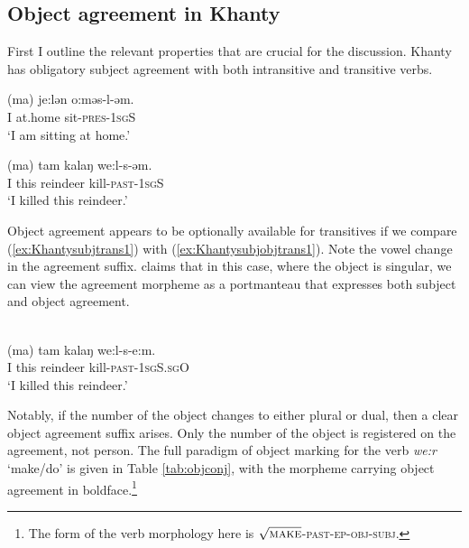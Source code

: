 \documentclass[output=paper
,modfonts
,nonflat]{langsci/langscibook}
\begin{document}
\subsection{Object agreement in Khanty}\label{khantyprop}

First I outline the relevant properties that are crucial for the discussion.
Khanty has obligatory subject agreement with both intransitive and transitive verbs. 

\begin{exe}
\ex \citet[][142]{dn2011}
\begin{xlist}
\ex
{\gll (ma) je:lən o:məs-l-əm.\\
I at.home sit-\textsc{pres}-\textsc{1sgS}\\
\glt `I am sitting at home.'} \label{ex:ostsubjintrans1}

\ex
{\gll (ma) tam kalaŋ we:l-s-əm.\\
I this reindeer kill-\textsc{past-1sgS}\\
\glt `I killed this reindeer.'} \label{ex:Khantysubjtrans1}
\end{xlist}
\end{exe}

\noindent Object agreement appears to be optionally available for transitives if we compare (\ref{ex:Khantysubjtrans1}) with (\ref{ex:Khantysubjobjtrans1}). Note the vowel change in the agreement suffix. \citet{nikolaeva1999} claims that in this case, where the object is singular, we can view the agreement morpheme as a portmanteau that expresses both subject and object agreement. 

\begin{exe}
  \ex \citet[][142]{dn2011}\\
{\gll (ma) tam kalaŋ we:l-s-e:m.\\
I this reindeer kill-\textsc{past-1sgS.sgO}\\
\glt `I killed this reindeer.'} \label{ex:Khantysubjobjtrans1}
\end{exe}

\noindent Notably, if the number of the object changes to either plural or dual, then a clear object agreement suffix arises.
Only the number of the object is registered on the agreement, not person.
The full paradigm of object marking for the verb \emph{we:r} `make/do' is given in Table \ref{tab:objconj}, with the morpheme carrying object agreement in boldface.\footnote{The form of the verb morphology here is $\sqrt{\textsc{make}}$-\textsc{past}-\textsc{ep}-\textsc{obj}-\textsc{subj}.}
\end{document}
